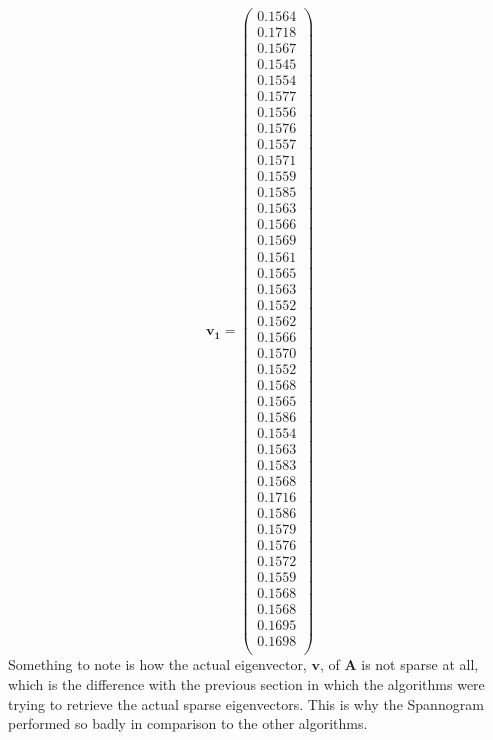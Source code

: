 \documentclass[11pt,a4paper]{article}
\newcommand{\covmat}{\mathbf{A}}
\begin{document}
\begin{equation*}
\mathbf{\mathbf{v}_1}=
\begin{pmatrix}
0.1564\\
0.1718\\
0.1567\\
0.1545\\
0.1554\\
0.1577\\
0.1556\\
0.1576\\
0.1557\\
0.1571\\
0.1559\\
0.1585\\
0.1563\\
0.1566\\
0.1569\\
0.1561\\
0.1565\\
0.1563\\
0.1552\\
0.1562\\
0.1566\\
0.1570\\
0.1552\\
0.1568\\
0.1565\\
0.1586\\
0.1554\\
0.1563\\
0.1583\\
0.1568\\
0.1716\\
0.1586\\
0.1579\\
0.1576\\
0.1572\\
0.1559\\
0.1568\\
0.1568\\
0.1695\\
0.1698\\
\end{pmatrix}
\end{equation*}
Something to note is how the actual eigenvector, $\mathbf{v}$, of $\covmat$ is not sparse at all, which is the difference with the previous section in which the algorithms were trying to retrieve the actual sparse eigenvectors. This is why the Spannogram performed so badly in comparison to the other algorithms. 

\end{document}
